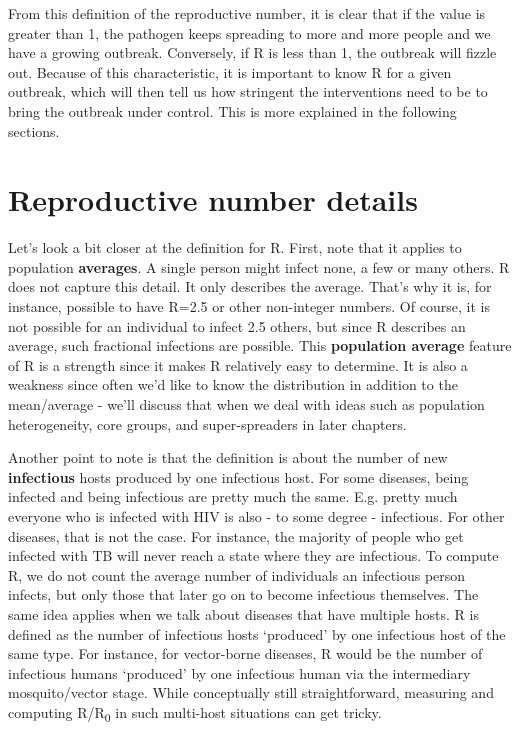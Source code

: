\documentclass[]{book}
\theoremstyle{definition}
\theoremstyle{definition}
\theoremstyle{definition}
\theoremstyle{remark}
\begin{document}
From this definition of the reproductive number, it is clear that if the
value is greater than 1, the pathogen keeps spreading to more and more
people and we have a growing outbreak. Conversely, if R is less than 1,
the outbreak will fizzle out. Because of this characteristic, it is
important to know R for a given outbreak, which will then tell us how
stringent the interventions need to be to bring the outbreak under
control. This is more explained in the following sections.

\hypertarget{reproductive-number-details}{%
\section{Reproductive number
details}\label{reproductive-number-details}}

Let's look a bit closer at the definition for R. First, note that it
applies to population \textbf{averages}. A single person might infect
none, a few or many others. R does not capture this detail. It only
describes the average. That's why it is, for instance, possible to have
R=2.5 or other non-integer numbers. Of course, it is not possible for an
individual to infect 2.5 others, but since R describes an average, such
fractional infections are possible. This \textbf{population average}
feature of R is a strength since it makes R relatively easy to
determine. It is also a weakness since often we'd like to know the
distribution in addition to the mean/average - we'll discuss that when
we deal with ideas such as population heterogeneity, core groups, and
super-spreaders in later chapters.

Another point to note is that the definition is about the number of new
\textbf{infectious} hosts produced by one infectious host. For some
diseases, being infected and being infectious are pretty much the same.
E.g. pretty much everyone who is infected with HIV is also - to some
degree - infectious. For other diseases, that is not the case. For
instance, the majority of people who get infected with TB will never
reach a state where they are infectious. To compute R, we do not count
the average number of individuals an infectious person infects, but only
those that later go on to become infectious themselves. The same idea
applies when we talk about diseases that have multiple hosts. R is
defined as the number of infectious hosts `produced' by one infectious
host of the same type. For instance, for vector-borne diseases, R would
be the number of infectious humans `produced' by one infectious human
via the intermediary mosquito/vector stage. While conceptually still
straightforward, measuring and computing R/R\textsubscript{0} in such
multi-host situations can get tricky.
\end{document}
